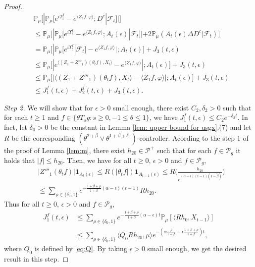\documentclass[12pt,a4paper]{amsart}
\theoremstyle{plain}
\theoremstyle{definition}
\numberwithin{equation}{section}
\begin{document}
\begin{proof}
\begin{align}
  \label{eq: inequality that will used later}
  & \mathbb{P}_\mu \Big[ |  \mathbb{P}_\mu [ e^{i\Upsilon^f_t} - e^{\langle Z_1f,\varphi \rangle} ; D^c | \mathscr F_{t}]   |\Big]  \\
  &  \leq \mathbb{P}_\mu   \Big[ |    \mathbb{P}_\mu [ e^{i \Upsilon^f_t }-e^{\langle Z_1f, \varphi\rangle}; A_{t}(\epsilon) | \mathscr F_{t}] |  + 2\mathbb P_\mu ( A_{t}(\epsilon) \Delta D^c | \mathscr F_{t}) \Big] \\
  & = \mathbb{P}_{\mu}\Big[ |\mathbb{P}_\mu [e^{i\Upsilon^f_t}| \mathscr F_{t}]-e^{\langle Z_1f, \varphi\rangle}| ; A_{t}(\epsilon) \Big] + J_3(t,\epsilon) \\
  & \leq \mathbb{P}_\mu \Big[ |e^{\langle (Z_1+Z'''_1) (\theta_t f),X_{t} \rangle}-e^{\langle Z_1f, \varphi\rangle} | ; A_{t}(\epsilon) \Big]+  J_3(t,\epsilon) \\
  & \leq \mathbb{P}_\mu \Big[ | \langle (Z_1+Z'''_1)(\theta_t f),X_{t} \rangle - \langle Z_1f, \varphi\rangle | ;A_{t}(\epsilon)\Big]+  J_3(t,\epsilon) \\
  & \leq J^f_1(t,\epsilon) + J^f_2(t,\epsilon)+ J_3(t,\epsilon).
\end{align}

\emph{Step 2.} We will show that for $\epsilon>0$ small enough, there exist  $C_2, \delta_2>0$ such that for each $t\geq 1$ and $f \in \{\theta T_sg: s\geq 0,-1\leq \theta \leq 1\}$, we have
\(
  J^f_1(t,\epsilon)
  \leq C_2e^{-\delta_2 t}.
\)
In fact, let $\delta_0 >0$ be the constant in Lemma \ref{lem: upper bound for usgx}.(7) and let $R$ be the corresponding $(\theta^{2+\beta}\vee \theta^{1+\beta+\delta_0})$-controller.
Acording to the step 1 of the proof of Lemma \ref{lem:m}, there exist $h_{20} \in \mathcal P^+$ such that for each $f \in \mathcal P_g$ it holds that $|f| \leq h_{20}$.
Then, we have for all $t\geq 0$, $\epsilon> 0$ and $f\in \mathcal P_g$,
\begin{align}
  & |Z'''_1(\theta_t f)|\mathbf{1}_{A_{t}(\epsilon)}
    \leq R(|\theta_{t} f|)\mathbf{1}_{A_{t-1}(\epsilon)}
  \leq R \Big(\frac{h_{20}}{e^{(\alpha-\epsilon)(t-1)(1-\tilde \beta)}}\Big) \\
   & \leq \sum_{\rho \in \{\delta_0,1\}}e^{-\frac{1+\beta+\rho}{1+\beta}(\alpha-\epsilon)(t-1)}Rh_{20}.
\end{align}
Thus for all $t\geq 0$, $\epsilon> 0$ and $f\in \mathcal P_g$,
\begin{align}
  \label{eq: estimate of J1}
  J^f_1(t,\epsilon)
  & \leq \sum_{\rho \in \{\delta_0,1\}}e^{-\frac{1+\beta+\rho}{1+\beta}(\alpha-\epsilon)t}\mathbb{P}_{\mu}[\langle Rh_0,X_{t-1}\rangle]\\
  & \leq \sum_{\rho \in \{\delta_0,1\}} \langle Q_0 R h_{20}, \mu \rangle e^{-(\alpha\frac{\rho}{1+\beta}-\epsilon\frac{1+\beta+\rho}{1+\beta})t},
\end{align}
where $Q_0$ is defined by \eqref{eq:Q}.
By taking $\epsilon>0$ small enough, we get the desired result in this step.


\end{proof}
\end{document}
